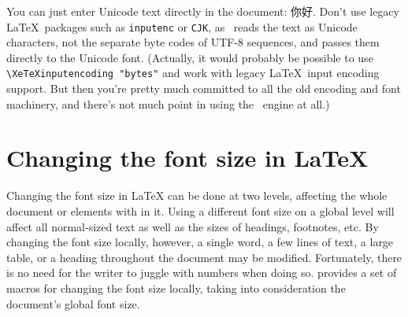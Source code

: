 You can just enter Unicode text directly in the document: 你好. Don't use legacy \LaTeX\ packages such as \verb|inputenc| or \verb|CJK|, as \XeTeX\ reads the text as Unicode characters, not the separate byte codes of UTF-8 sequences, and passes them directly to the Unicode font. (Actually, it would probably be possible to use \verb|\XeTeXinputencoding "bytes"| and work with legacy \LaTeX\ input encoding support. But then you're pretty much committed to all the old encoding and font machinery, and there's not much point in using the \XeTeX\ engine at all.)


\begin{comment}
\setromanfont{Times New Roman}

\subsection{A CJK environment}

\newenvironment{CJK}{\fontspec[Scale=0.9]{SimSun}}{}

\newcommand{\cjk}[1]{{\fontspec[Scale=0.9]{SimSun}#1}}

Rather than selecting a CJK font as the main document typeface, you might want to define a CJK environment for text fragments used in the midst of a document using a normal Roman font. This allows me to say \verb|\begin{CJK}東光\end{CJK}| to generate \begin{CJK}東光\end{CJK}, without putting the whole paragraph into the Far Eastern font. Or I could define a command that takes the CJK text as an argument, so that \verb|\cjk{北京}| produces \cjk{北京}. It's that easy! Such an environment can easily be set using the \cmd{newfamily} or \cmd{\fontspec}.

\begin{verbatim}
\newenvironment{CJK}{\fontspec[Scale=0.9]{SimSun}}{}
\newcommand{\cjk}[1]{{\fontspec[Scale=0.9]{SimSun}#1}}
\end{verbatim}
\end{comment}


\normalfont

\section{Changing the font size in LaTeX}


Changing the font size in LaTeX can be done at two levels, 
affecting the whole document or elements with in it. 
Using a different font size on a
global level will affect all normal-sized text as well
as the sizes of headings, footnotes, etc. By changing
the font size locally, however, a single word, a few
lines of text, a large table, or a heading throughout
the document may be modified. Fortunately, there is
no need for the writer to juggle with numbers when
doing so. \latex provides a set of macros for changing
the font size locally, taking into consideration the
document’s global font size. \citep{thurnherr2012}

